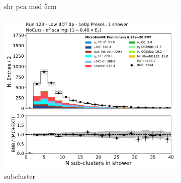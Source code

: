 \begin{figure}[H]
\begin{subfigure}{0.3\textwidth}
    \caption{shr pca med 5cm}
    \end{subfigure}
    \begin{subfigure}{0.3\textwidth}
    \includegraphics[width=1.0\textwidth]{1e0p/Low_BDT_Sideband/subcluster.pdf}
    \caption{subcluster}
    \end{subfigure}
    \caption{} 
    \label{fig:HE_1eNp_1}
\end{figure}

